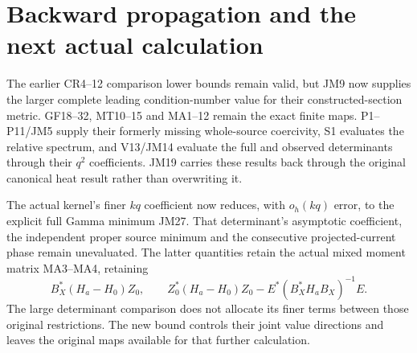 \section{Backward propagation and the next actual calculation}
The earlier CR4--12 comparison lower bounds remain valid, but JM9
now supplies the larger complete leading condition-number value
for their constructed-section metric. GF18--32, MT10--15 and MA1--12
remain the exact finite maps. P1--P11/JM5 supply their formerly
missing whole-source coercivity, S1 evaluates the relative spectrum,
and V13/JM14 evaluate the full and observed determinants through
their $q^2$ coefficients. JM19 carries these results back through
the original canonical heat result rather than overwriting it.

The actual kernel's finer $kq$ coefficient now reduces, with
$o_h(kq)$ error, to the explicit full Gamma minimum JM27.
That determinant's asymptotic coefficient, the independent proper
source minimum and the consecutive projected-current phase remain
unevaluated. The latter quantities retain the actual mixed
moment matrix MA3--MA4, retaining
\[
 B_X^*(H_a-H_0)Z_0,\qquad
 Z_0^*(H_a-H_0)Z_0-E^*(B_X^*H_aB_X)^{-1}E.\tag{JM20}
\]
The large determinant comparison does not allocate its finer terms
between those original restrictions. The new bound controls their
joint value directions and leaves the original maps available for
that further calculation.

